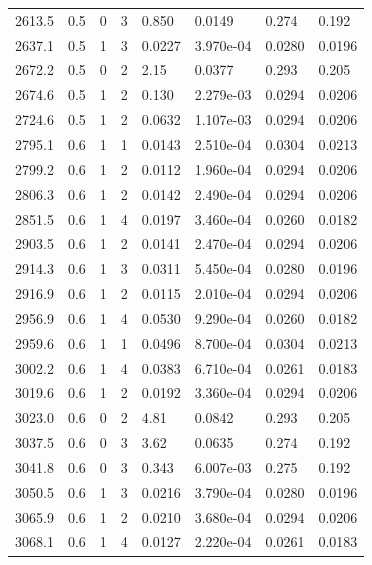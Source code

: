 \documentclass[preview]{standalone}
\begin{document}
{{{\begin{tabular}{L{1.2cm}C{1.2cm} C{0.3cm}C{0.5cm} C{1.4cm}C{1.4cm} C{1.4cm}C{1.4cm}}
  2613.5  &   0.5  & 0     &  3 &  0.850  & 0.0149  & 0.274 &  0.192   \\ 
  2637.1  &   0.5  & 1     &  3 &  0.0227  & 3.970e-04  & 0.0280 &  0.0196   \\ 
  2672.2  &   0.5  & 0     &  2 &  2.15  & 0.0377  & 0.293 &  0.205   \\ 
  2674.6  &   0.5  & 1     &  2 &  0.130  & 2.279e-03  & 0.0294 &  0.0206   \\ 
  2724.6  &   0.5  & 1     &  2 &  0.0632  & 1.107e-03  & 0.0294 &  0.0206   \\ 
  2795.1  &   0.6  & 1     &  1 &  0.0143  & 2.510e-04  & 0.0304 &  0.0213   \\ 
  2799.2  &   0.6  & 1     &  2 &  0.0112  & 1.960e-04  & 0.0294 &  0.0206   \\ 
  2806.3  &   0.6  & 1     &  2 &  0.0142  & 2.490e-04  & 0.0294 &  0.0206   \\ 
  2851.5  &   0.6  & 1     &  4 &  0.0197  & 3.460e-04  & 0.0260 &  0.0182   \\ 
  2903.5  &   0.6  & 1     &  2 &  0.0141  & 2.470e-04  & 0.0294 &  0.0206   \\ 
  2914.3  &   0.6  & 1     &  3 &  0.0311  & 5.450e-04  & 0.0280 &  0.0196   \\ 
  2916.9  &   0.6  & 1     &  2 &  0.0115  & 2.010e-04  & 0.0294 &  0.0206   \\ 
  2956.9  &   0.6  & 1     &  4 &  0.0530  & 9.290e-04  & 0.0260 &  0.0182   \\ 
  2959.6  &   0.6  & 1     &  1 &  0.0496  & 8.700e-04  & 0.0304 &  0.0213   \\ 
  3002.2  &   0.6  & 1     &  4 &  0.0383  & 6.710e-04  & 0.0261 &  0.0183   \\ 
  3019.6  &   0.6  & 1     &  2 &  0.0192  & 3.360e-04  & 0.0294 &  0.0206   \\ 
  3023.0  &   0.6  & 0     &  2 &  4.81  & 0.0842  & 0.293 &  0.205   \\ 
  3037.5  &   0.6  & 0     &  3 &  3.62  & 0.0635  & 0.274 &  0.192   \\ 
  3041.8  &   0.6  & 0     &  3 &  0.343  & 6.007e-03  & 0.275 &  0.192   \\ 
  3050.5  &   0.6  & 1     &  3 &  0.0216  & 3.790e-04  & 0.0280 &  0.0196   \\ 
  3065.9  &   0.6  & 1     &  2 &  0.0210  & 3.680e-04  & 0.0294 &  0.0206   \\ 
  3068.1  &   0.6  & 1     &  4 &  0.0127  & 2.220e-04  & 0.0261 &  0.0183   \\ 

\end{tabular}}}}
\end{document}
